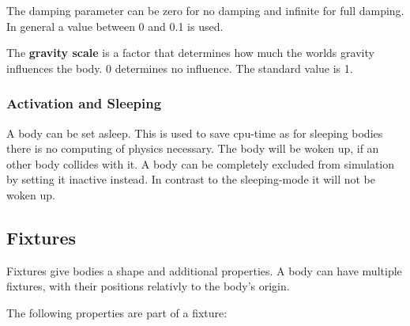 \documentclass[10pt,a4paper,DIV=11]{scrreprt}
\begin{document}
The damping parameter can be zero for no damping and infinite for full damping. In general a value between 0 and 0.1 is used.

The \textbf{gravity scale} is a factor that determines how much the worlds gravity influences the body. 0 determines no influence. The standard value is 1.

\subsubsection*{Activation and Sleeping}
A body can be set asleep. This is used to save cpu-time as for sleeping bodies there is no computing of physics necessary. The body will be woken up, if an other body collides with it.
A body can be completely excluded from simulation by setting it inactive instead.
In contrast to the sleeping-mode it will not be woken up.





\subsection{Fixtures}
Fixtures give bodies a shape and additional properties. A body can have multiple fixtures, with their positions relativly to the body's origin.

The following properties are part of a fixture:


   \\
\\
\end{document}
